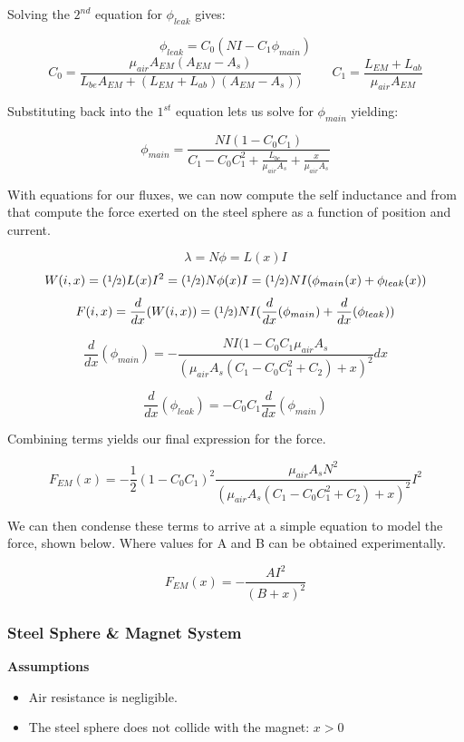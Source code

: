 \documentclass{article}
\theoremstyle{plain}
\theoremstyle{definition}
\theoremstyle{remark}
\begin{document}
Solving the $2^{nd}$ equation for $\phi_{leak}$ gives:

$$\phi_{leak} = C_{0}\left( NI-C_{1}\phi_{main} \right)$$ 
$$C_{0} = \frac{\mu_{air} A_{EM} (A_{EM} - A_{s})}{L_{be} A_{EM} + (L_{EM} + L_{ab})(A_{EM} - A_{s}))} \hspace{1cm} 
C_{1} = \frac{L_{EM} + L_{ab}}{\mu_{air} A_{EM}} $$

Substituting back into the $1^{st}$ equation lets us solve for $\phi_{main}$ yielding: 

$$ \phi_{main} = \frac{NI(1-C_{0}C_{1})}{C_{1} - C_{0} C_{1}^2 + \frac{L_{bc}}{\mu_{air} A_{s}} + \frac{x}{\mu_{air} A_{s}}} $$

With equations for our fluxes, we can now compute the self inductance and from that compute the force exerted on the steel sphere as a function of position and current.

$$ \lambda = N \phi = L(x) I $$
$$ W(i,x) = (\sfrac{1}{2}) L(x) I^2 = (\sfrac{1}{2}) N \phi(x) I =(\sfrac{1}{2}) N I (\phi_{main}(x) + \phi_{leak}(x))$$
$$ F(i,x) = \frac{d}{dx} (W(i,x) )= (\sfrac{1}{2}) N I ( \frac{d}{dx} (\phi_{main}) + \frac{d}{dx} (\phi_{leak})) $$

$$ \frac{d}{dx}(\phi_{main}) = - \frac{N I (1 - C_{0}C_{1} \mu_{air} A_{s}}{(\mu_{air} A_{s}(C_{1} - C_{0} C_{1}^2 + C_{2}) + x)^2} dx$$

$$ \frac{d}{dx}(\phi_{leak}) = -C_{0} C_{1} \frac{d}{dx}(\phi_{main})$$

Combining terms yields our final expression for the force.

$$ F_{EM}(x) = -\frac{1}{2} \left( 1 - C_{0}C_{1} \right)^2 \frac{\mu_{air} A_{s} N^2 }{(\mu_{air} A_{s}(C_{1} - C_{0} C_{1}^2 + C_{2}) + x)^2} I^2 $$

We can then condense these terms to arrive at a simple equation to model the force, shown below.  Where values for A and B can be obtained experimentally.

$$ F_{EM}(x) = -\frac{A I^2}{(B+x)^2} $$

\subsubsection*{Steel Sphere \& Magnet System}
\textbf{Assumptions}
\begin{itemize}
\item Air resistance is negligible.
\item The steel sphere does not collide with the magnet: $x > 0$
\end{itemize}
\end{document}
